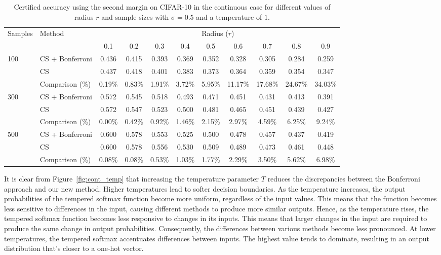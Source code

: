 \begin{table}[htbp]
    \centering
    \caption{Certified accuracy using the second margin on CIFAR-10 in the continuous case for different values of radius $r$ and sample sizes with $\sigma = 0.5$ and a temperature of $1$.}
    \label{tab:certified-accuracy-2}
    \renewcommand{\arraystretch}{1.2}
    \begin{tabular}{@{}ll*{9}{c}@{}}
        \toprule
        \multirow{2}{*}{Samples} & \multirow{2}{*}{Method} & \multicolumn{9}{c}{Radius ($r$)} \\
        \cmidrule(l){3-11}
        & & 0.1 & 0.2 & 0.3 & 0.4 & 0.5 & 0.6 & 0.7 & 0.8 & 0.9 \\
        \midrule
        \multirow{3}{*}{100}
        & CS + Bonferroni & 0.436 & 0.415 & 0.393 & 0.369 & 0.352 & 0.328 & 0.305 & 0.284 & 0.259 \\
        & CS              & 0.437 & 0.418 & 0.401 & 0.383 & 0.373 & 0.364 & 0.359 & 0.354 & 0.347 \\
        & Comparison (\%) & 0.19\% & 0.83\% & 1.91\% & 3.72\% & 5.95\% & 11.17\% & 17.68\% & 24.67\% & 34.03\% \\
        \midrule
        \multirow{3}{*}{300}
        & CS + Bonferroni & 0.572 & 0.545 & 0.518 & 0.493 & 0.471 & 0.451 & 0.431 & 0.413 & 0.391 \\
        & CS              & 0.572 & 0.547 & 0.523 & 0.500 & 0.481 & 0.465 & 0.451 & 0.439 & 0.427 \\
        & Comparison (\%) & 0.00\% & 0.42\% & 0.92\% & 1.46\% & 2.15\% & 2.97\% & 4.59\% & 6.25\% & 9.24\% \\
        \midrule
        \multirow{3}{*}{500}
        & CS + Bonferroni & 0.600 & 0.578 & 0.553 & 0.525 & 0.500 & 0.478 & 0.457 & 0.437 & 0.419 \\
        & CS              & 0.600 & 0.578 & 0.556 & 0.530 & 0.509 & 0.489 & 0.473 & 0.461 & 0.448 \\
        & Comparison (\%) & 0.08\% & 0.08\% & 0.53\% & 1.03\% & 1.77\% & 2.29\% & 3.50\% & 5.62\% & 6.98\% \\
        \bottomrule
    \end{tabular}
\end{table}

It is clear from Figure~\ref{fig:cont_temp} that increasing the temperature parameter $T$ reduces the discrepancies between the Bonferroni approach and our new method.
Higher temperatures lead to softer decision boundaries.
As the temperature increases, the output probabilities of the tempered softmax function become more uniform, regardless of the input values.
This means that the function becomes less sensitive to differences in the input, causing different methods to produce more similar outputs.
Hence, as the temperature rises, the tempered softmax function becomes less responsive to changes in its inputs.
This means that larger changes in the input are required to produce the same change in output probabilities.
Consequently, the differences between various methods become less pronounced.
At lower temperatures, the tempered softmax accentuates differences between inputs.
The highest value tends to dominate, resulting in an output distribution that's closer to a one-hot vector.
